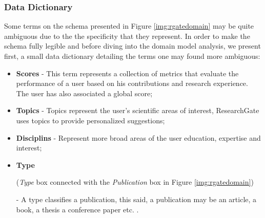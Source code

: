 \subsubsection*{Data Dictionary}
Some terms on the schema presented in Figure \ref{img:rgatedomain} may be quite ambiguous due to the the specificity that they represent. In order to make the schema fully legible and before diving into the domain model analysis, we present first, a small data dictionary detailing the terms one may found more ambiguous:

\begin{itemize}
\item \textbf{Scores} - This term represents a collection of metrics that evaluate the performance of a user based on his contributions and research experience. The user has also associated a global score;
\item \textbf{Topics} - Topics represent the user's scientific areas of interest, ResearchGate uses topics to provide personalized suggestions;
\item \textbf{Disciplins} - Represent more broad areas of the user education,
expertise and interest;
\item \textbf{Type} \begin{small}(\textit{Type} box connected with the \textit{Publication} box in Figure \ref{img:rgatedomain})\end{small} - A type classifies a publication, this said, a publication may be an article, a book, a thesis a conference paper etc. .
\end{itemize}


